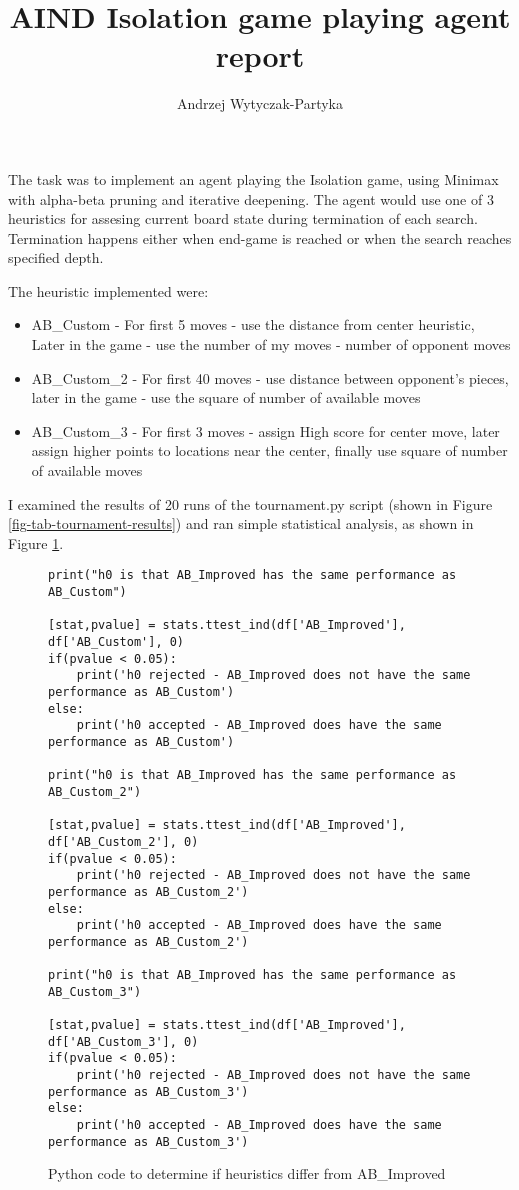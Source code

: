 \documentclass[12pt, a4paper]{article}
\author{Andrzej Wytyczak-Partyka}
\title{AIND Isolation game playing agent report}
\begin{document}
\maketitle
The task was to implement an agent playing the Isolation game, using Minimax with
alpha-beta pruning and iterative deepening. The agent would use one of 3 heuristics
for assesing current board state during termination of each search. Termination
happens either when end-game is reached or when the search reaches specified depth.

The heuristic implemented were:
\begin{itemize}
  \item AB\_Custom - For first 5 moves - use the distance from center heuristic, Later in the game - use the number of my moves - number of opponent moves
  \item AB\_Custom\_2 - For first 40 moves - use distance between opponent's pieces, later in the game - use the square of number of available moves
  \item AB\_Custom\_3 - For first 3 moves - assign High score for center move, later assign higher points to locations near the center, finally use square of number of available moves
\end{itemize}

I examined the results of 20 runs of the tournament.py script (shown in Figure \ref{fig-tab-tournament-results})
and ran simple statistical analysis, as shown in Figure \ref{fig-code-ttest}.

\begin{figure}[hbtp]
\begin{verbatim}
print("h0 is that AB_Improved has the same performance as AB_Custom")

[stat,pvalue] = stats.ttest_ind(df['AB_Improved'], df['AB_Custom'], 0)
if(pvalue < 0.05):
    print('h0 rejected - AB_Improved does not have the same performance as AB_Custom')
else:
    print('h0 accepted - AB_Improved does have the same performance as AB_Custom')

print("h0 is that AB_Improved has the same performance as AB_Custom_2")

[stat,pvalue] = stats.ttest_ind(df['AB_Improved'], df['AB_Custom_2'], 0)
if(pvalue < 0.05):
    print('h0 rejected - AB_Improved does not have the same performance as AB_Custom_2')
else:
    print('h0 accepted - AB_Improved does have the same performance as AB_Custom_2')

print("h0 is that AB_Improved has the same performance as AB_Custom_3")

[stat,pvalue] = stats.ttest_ind(df['AB_Improved'], df['AB_Custom_3'], 0)
if(pvalue < 0.05):
    print('h0 rejected - AB_Improved does not have the same performance as AB_Custom_3')
else:
    print('h0 accepted - AB_Improved does have the same performance as AB_Custom_3')
\end{verbatim}
\caption{Python code to determine if heuristics differ from AB\_Improved}
\label{fig-code-ttest}
\end{figure}
\end{document}
